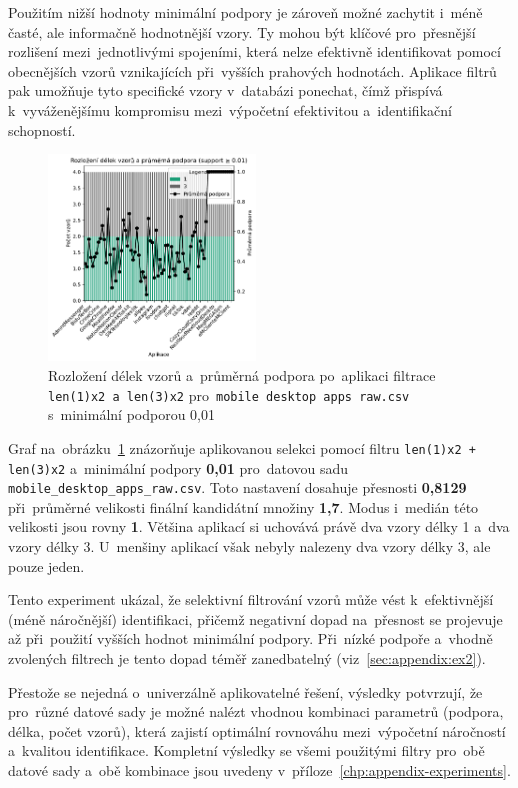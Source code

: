 Použitím nižší hodnoty minimální podpory je zároveň možné zachytit i~méně časté, ale informačně hodnotnější vzory. Ty mohou být klíčové pro~přesnější rozlišení mezi~jednotlivými spojeními, která nelze efektivně identifikovat pomocí obecnějších vzorů vznikajících při~vyšších prahových hodnotách. Aplikace filtrů pak umožňuje tyto specifické vzory v~databázi ponechat, čímž přispívá k~vyváženějšímu kompromisu mezi~výpočetní efektivitou a~identifikační schopností.

\begin{figure}
	\centering
	\includegraphics[width=0.49\textwidth]{obrazky-figures/exps/pattern_lengths_filtered_0.01_mobile.pdf}
	\caption{Rozložení délek vzorů a~průměrná podpora po~aplikaci filtrace \texttt{len(1)x2 a~len(3)x2} pro~\texttt{mobile desktop apps raw.csv} s~minimální podporou 0{,}01}
	\label{fig:pattern_lengths-filtered-mobile}
\end{figure}

Graf na~obrázku~\ref{fig:pattern_lengths-filtered-mobile} znázorňuje aplikovanou selekci pomocí filtru \texttt{len(1)x2 + len(3)x2} a~minimální podpory \textbf{0{,}01} pro~datovou sadu \texttt{mobile\_desktop\_apps\_raw.csv}. Toto nastavení dosahuje přesnosti \textbf{0{,}8129} při~průměrné velikosti finální kandidátní množiny \textbf{1{,}7}. Modus i~medián této velikosti jsou rovny \textbf{1}. Většina aplikací si uchovává právě dva vzory délky 1 a~dva vzory délky 3. U~menšiny aplikací však nebyly nalezeny dva vzory délky 3, ale pouze jeden.

Tento experiment ukázal, že selektivní filtrování vzorů může vést k~efektivnější (méně náročnější) identifikaci, přičemž negativní dopad na~přesnost se projevuje až při~použití vyšších hodnot minimální podpory. Při~nízké podpoře a~vhodně zvolených filtrech je tento dopad téměř zanedbatelný (viz~\ref{sec:appendix:ex2}). 

Přestože se nejedná o~univerzálně aplikovatelné řešení, výsledky potvrzují, že pro~různé datové sady je možné nalézt vhodnou kombinaci parametrů (podpora, délka, počet vzorů), která zajistí optimální rovnováhu mezi~výpočetní náročností a~kvalitou identifikace. Kompletní výsledky se všemi použitými filtry pro~obě datové sady a~obě kombinace jsou uvedeny v~příloze~\ref{chp:appendix-experiments}.

